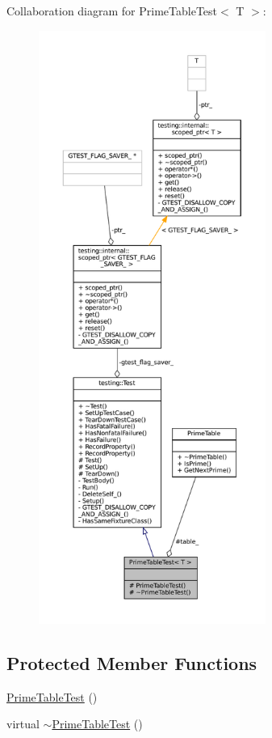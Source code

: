 Collaboration diagram for Prime\+Table\+Test$<$ T $>$\+:
\nopagebreak
\begin{figure}[H]
\begin{center}
\leavevmode
\includegraphics[height=550pt]{classPrimeTableTest__coll__graph}
\end{center}
\end{figure}
\subsection*{Protected Member Functions}
\begin{DoxyCompactItemize}
\item 
\hyperlink{classPrimeTableTest_ab83d0b24b41bff1ace55f9a8d5ea6dcf}{Prime\+Table\+Test} ()
\item 
virtual \hyperlink{classPrimeTableTest_a4fb27ce277675d58ea3f8db99e3bb2b4}{$\sim$\+Prime\+Table\+Test} ()
\end{DoxyCompactItemize}
